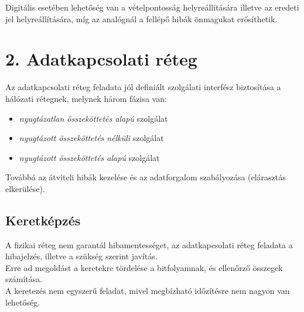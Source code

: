 \documentclass[12pt]{article}
\begin{document}
    \noindent Digitális esetében lehetőség van a vételpontosság helyreállítására illetve az eredeti jel helyreállítására, míg az analógnál a fellépő hibák önmagukat erősíthetik.

\newpage		
    \section*{2. Adatkapcsolati réteg}
		
	   Az adatkapcsolati réteg feladata jól definiált szolgálati interfész biztosítása a hálózati rétegnek, melynek három fázisa van:
        \begin{itemize}[leftmargin=7.5mm]
        \renewcommand{\labelitemi}{$\vcenter{\hbox{\tiny$\bullet$}}$}
            \item \emph{nyugtázatlan összeköttetés alapú} szolgálat
            \item \emph{nyugtázott összeköttetés nélküli} szolgálat
            \item \emph{nyugtázott összeköttetés alapú} szolgálat
        \end{itemize}
        Továbbá az átviteli hibák kezelése és az adatforgalom szabályozása (elárasztás elkerülése).

    \subsection*{Keretképzés\\}
        A fizikai réteg nem garantál hibamentességet, az adatkapcsolati réteg feladata a hibajelzés, illetve a szükség szerint javítás. \\

        \noindent Erre ad megoldást a keretekre tördelése a bitfolyamnak, és ellenőrző összegek számítása.\\
        A keretezés nem egyszerű feladat, mivel megbízható időzítésre nem nagyon van lehetőség.\\
\end{document}
